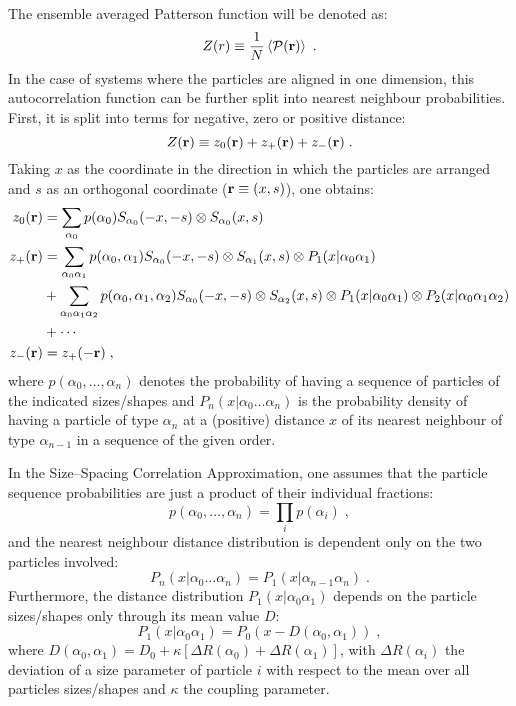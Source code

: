 The ensemble averaged Patterson function will be denoted as:
\begin{equation*}
  Z(r) \equiv \frac{1}{N}\left\langle \mathcal{P} (\mathbf{r} ) \right\rangle_{}  \; .
\end{equation*}
In the case of systems where the particles are aligned in one dimension, this autocorrelation function can be further split into nearest neighbour probabilities. First, it is split into terms for negative, zero or positive distance:
\begin{equation*}
  Z(\mathbf{r} ) \equiv z_0(\mathbf{r} ) + z_+(\mathbf{r} ) + z_-(\mathbf{r} ) \; .
\end{equation*}
Taking $x$ as the coordinate in the direction in which the particles are arranged and $s$ as an orthogonal coordinate ($\mathbf{r} \equiv (x,s)$), one obtains:
\begin{align*}
  z_0(\mathbf{r} ) &= \sum_{\alpha_0} p(\alpha_0) S_{\alpha_0}(-x,-s) \otimes S_{\alpha_0}(x,s)  \\
  z_+(\mathbf{r} ) &= \sum_{\alpha_0\alpha_1} p(\alpha_0,\alpha_1) S_{\alpha_0}(-x,-s) \otimes S_{\alpha_1}(x,s) \otimes P_1(x|\alpha_0\alpha_1)  \\
               &+ \sum_{\alpha_0\alpha_1\alpha_2} p(\alpha_0,\alpha_1,\alpha_2) S_{\alpha_0}(-x,-s) \otimes S_{\alpha_2}(x,s) \otimes P_1(x|\alpha_0\alpha_1) \otimes P_2(x|\alpha_0\alpha_1\alpha_2)  \\
               &+ \dotsb \\
  z_-(\mathbf{r} ) &= z_+(-\mathbf{r} ) \; ,
\end{align*}
where $p(\alpha_0,\dotsc ,\alpha_n)$ denotes the probability of having a sequence of particles of the indicated sizes/shapes and $P_n(x|\alpha_0\dotsc\alpha_n)$ is the probability density of having a particle of type $\alpha_n$ at a (positive) distance $x$ of its nearest neighbour of type $\alpha_{n-1}$ in a sequence of the given order.



In the Size--Spacing Correlation Approximation, one assumes that the particle sequence probabilities are just a product of their individual fractions:
\begin{equation*}
  p(\alpha_0,\dotsc ,\alpha_n) = \prod_i p(\alpha_i) \; ,
\end{equation*}
and the nearest neighbour distance distribution is dependent only on the two particles involved:
\begin{equation*}
  P_n(x|\alpha_0\dotsc\alpha_n) = P_1(x|\alpha_{n-1}\alpha_n) \; .
\end{equation*}
Furthermore, the distance distribution $P_1(x|\alpha_0\alpha_1)$ depends on the particle sizes/shapes only through its mean value $D$:
\begin{equation*}
  P_1(x|\alpha_0\alpha_1) = P_0(x - D(\alpha_0,\alpha_1) ) \; ,
\end{equation*}
where $D(\alpha_0,\alpha_1) = D_0 + \kappa \left[ \Delta R(\alpha_0) + \Delta R(\alpha_1) \right]$, with $\Delta R(\alpha_i)$ the deviation of a size parameter of particle $i$ with respect to the mean over all particles sizes/shapes and $\kappa$ the coupling parameter.

